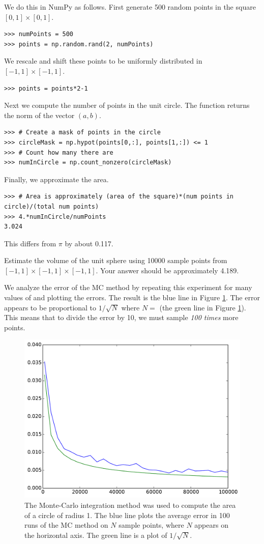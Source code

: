 We do this in NumPy as follows. First generate 500 random points in the square $[0,1] \times [0,1]$.
\begin{lstlisting}
>>> numPoints = 500
>>> points = np.random.rand(2, numPoints)
\end{lstlisting}
We rescale and shift these points to be uniformly distributed in $[-1,1]\times[-1,1]$.
\begin{lstlisting}
>>> points = points*2-1
\end{lstlisting}
Next we compute the number of points in the unit circle.
The function  returns the norm of the vector $(a, b)$.
\begin{lstlisting}
>>> # Create a mask of points in the circle
>>> circleMask = np.hypot(points[0,:], points[1,:]) <= 1
>>> # Count how many there are
>>> numInCircle = np.count_nonzero(circleMask)
\end{lstlisting}
Finally, we approximate the area.
\begin{lstlisting}
>>> # Area is approximately (area of the square)*(num points in circle)/(total num points)
>>> 4.*numInCircle/numPoints
3.024
\end{lstlisting}
This differs from $\pi$ by about 0.117.

\begin{problem}
Estimate the volume of the unit sphere using 10000 sample points from $[-1,1]\times[-1,1]\times[-1,1]$. Your answer should be approximately 4.189.
\end{problem}

We analyze the error of the MC method by repeating this experiment for many values of  and plotting the errors.
The result is the blue line in Figure \ref{fig:mc_error}.
The error appears to be proportional to $1/\sqrt{N}$ where $N=$  (the green line in Figure \ref{fig:mc_error}).
This means that to divide the error by 10, we must sample \emph{100 times} more points.

\begin{figure}
\includegraphics[width=.7\textwidth]{mc_error.pdf}
\caption{The Monte-Carlo integration method was used to compute the area of a circle of radius 1.
The blue line plots the average error in 100 runs of the MC method on $N$ sample points, where $N$ appears on the horizontal axis.
The green line is a plot of $1/\sqrt{N}$. }
\label{fig:mc_error}
\end{figure}

